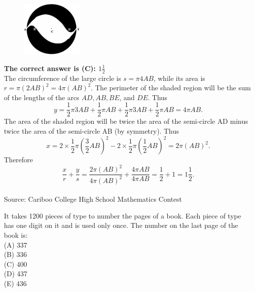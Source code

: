 \documentclass{article}
\begin{document}
\begin{figure}
	\includegraphics[width=30mm,viewport=16 80 533 545]{CCFR74-7pic.eps}
\end{figure}

\textbf{The correct answer is (C): $1\frac{1}{2}$}\\[1 ex]
The circumference of the large circle is $s=\pi 4AB$, while its area is $r=\pi(2AB)^2=4\pi(AB)^2$. The perimeter of the shaded region will be the sum of the lengths of the arcs $AD,AB,BE$, and $DE$. Thus
\begin{equation*}
y=\frac{1}{2}\pi3AB+\frac{1}{2}\pi AB+\frac{1}{2}\pi3AB+\frac{1}{2}\pi AB=4\pi AB.
\end{equation*}
The area of the shaded region will be twice the area of the semi-circle AD minus twice the area of the semi-circle AB (by symmetry). Thus
\begin{equation*}
x=2\times\frac{1}{2}\pi(\frac{3}{2}AB)^2-2\times\frac{1}{2}\pi(\frac{1}{2}AB)^2=2\pi(AB)^2.
\end{equation*}
Therefore
\begin{equation*}
\frac{x}{r}+\frac{y}{s}=\frac{2\pi(AB)^2}{4\pi(AB)^2}+\frac{4\pi AB}{4\pi AB}=\frac{1}{2}+1=1\frac{1}{2}.
\end{equation*}
\\[5 ex]

\scriptsize
Source: Cariboo College High School Mathematics Contest

\normalsize
It takes 1200 pieces of type to number the pages of a book. Each piece of type has one digit on it and is used only once. The number on the last page of the book is:\\
(A) 337\\
(B) 336\\
(C) 400\\
(D) 437\\
(E) 436\\
\end{document}
